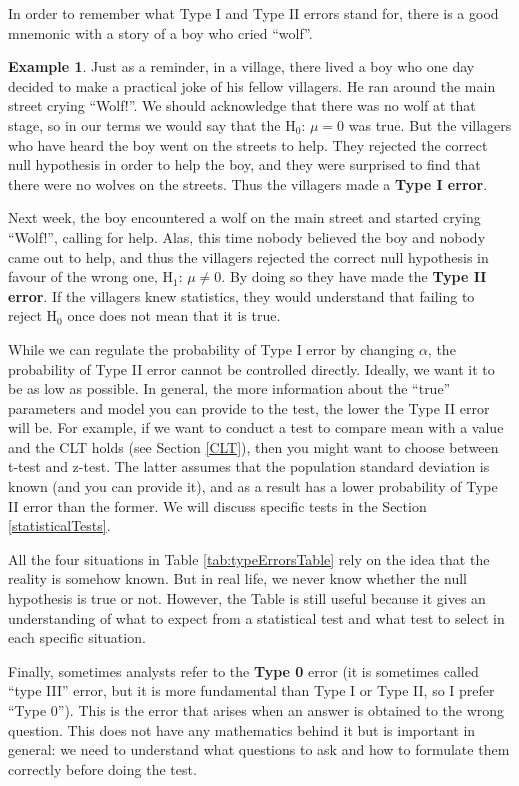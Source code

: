 \documentclass[
]{book}
\theoremstyle{definition}
\theoremstyle{definition}
\newtheorem{example}{Example}[chapter]
\theoremstyle{definition}
\theoremstyle{definition}
\theoremstyle{remark}
\begin{document}
In order to remember what Type I and Type II errors stand for, there is a good mnemonic with a story of a boy who cried ``wolf''.

\begin{example}
Just as a reminder, in a village, there lived a boy who one day decided to make a practical joke of his fellow villagers. He ran around the main street crying ``Wolf!''. We should acknowledge that there was no wolf at that stage, so in our terms we would say that the \(\mathrm{H}_0\): \(\mu=0\) was true. But the villagers who have heard the boy went on the streets to help. They rejected the correct null hypothesis in order to help the boy, and they were surprised to find that there were no wolves on the streets. Thus the villagers made a \textbf{Type I error}.

Next week, the boy encountered a wolf on the main street and started crying ``Wolf!'', calling for help. Alas, this time nobody believed the boy and nobody came out to help, and thus the villagers rejected the correct null hypothesis in favour of the wrong one, \(\mathrm{H}_1\): \(\mu\neq 0\). By doing so they have made the \textbf{Type II error}. If the villagers knew statistics, they would understand that failing to reject \(\mathrm{H}_0\) once does not mean that it is true.
\end{example}

While we can regulate the probability of Type I error by changing \(\alpha\), the probability of Type II error cannot be controlled directly. Ideally, we want it to be as low as possible. In general, the more information about the ``true'' parameters and model you can provide to the test, the lower the Type II error will be. For example, if we want to conduct a test to compare mean with a value and the CLT holds (see Section \ref{CLT}), then you might want to choose between t-test and z-test. The latter assumes that the population standard deviation is known (and you can provide it), and as a result has a lower probability of Type II error than the former. We will discuss specific tests in the Section \ref{statisticalTests}.

All the four situations in Table \ref{tab:typeErrorsTable} rely on the idea that the reality is somehow known. But in real life, we never know whether the null hypothesis is true or not. However, the Table is still useful because it gives an understanding of what to expect from a statistical test and what test to select in each specific situation.

Finally, sometimes analysts refer to the \textbf{Type 0} error (it is sometimes called ``type III'' error, but it is more fundamental than Type I or Type II, so I prefer ``Type 0''). This is the error that arises when an answer is obtained to the wrong question. This does not have any mathematics behind it but is important in general: we need to understand what questions to ask and how to formulate them correctly before doing the test.
\end{document}

